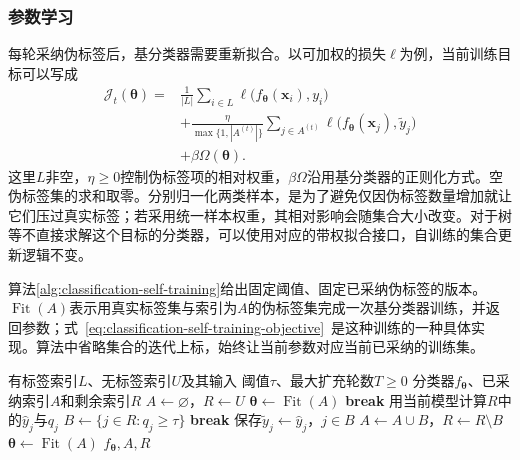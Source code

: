 \subsubsection{参数学习}
\label{sec:classification-self-training-learning}

每轮采纳伪标签后，基分类器需要重新拟合。以可加权的损失$\ell$为例，当前训练目标可以写成
\begin{equation}
  \label{eq:classification-self-training-objective}
  \begin{aligned}
    \mathcal{J}_t(\bm{\theta})
      ={}&\frac{1}{|L|}\sum_{i\in L}
        \ell\bigl(f_{\bm{\theta}}(\bm{x}_i),y_i\bigr)\\
      &+\frac{\eta}{\max\{1,|A^{(t)}|\}}
        \sum_{j\in A^{(t)}}
        \ell\bigl(f_{\bm{\theta}}(\bm{x}_j),\widetilde y_j\bigr)\\
      &+\beta\Omega(\bm{\theta}).
  \end{aligned}
\end{equation}
这里$L$非空，$\eta\geq0$控制伪标签项的相对权重，$\beta\Omega$沿用基分类器的正则化方式。空伪标签集的求和取零。分别归一化两类样本，是为了避免仅因伪标签数量增加就让它们压过真实标签；若采用统一样本权重，其相对影响会随集合大小改变。对于树等不直接求解这个目标的分类器，可以使用对应的带权拟合接口，自训练的集合更新逻辑不变。

算法\ref{alg:classification-self-training}给出固定阈值、固定已采纳伪标签的版本。$\operatorname{Fit}(A)$表示用真实标签集与索引为$A$的伪标签集完成一次基分类器训练，并返回参数；式~\eqref{eq:classification-self-training-objective}~是这种训练的一种具体实现。算法中省略集合的迭代上标，始终让当前参数对应当前已采纳的训练集。

\begin{algorithm}[带最终重训的自训练]
  \label{alg:classification-self-training}
  \begin{algorithmic}[1]
    \Require 有标签索引$L$、无标签索引$U$及其输入
    \Require 阈值$\tau$、最大扩充轮数$T\geq0$
    \Ensure 分类器$f_{\bm{\theta}}$、已采纳索引$A$和剩余索引$R$
    \State $A\gets\varnothing$，$R\gets U$
    \State $\bm{\theta}\gets\operatorname{Fit}(A)$
        \State \textbf{break}
      \EndIf
      \State 用当前模型计算$R$中的$\widehat y_j$与$q_j$
      \State $B\gets\{j\in R:q_j\geq\tau\}$
        \State \textbf{break}
      \EndIf
      \State 保存$\widetilde y_j\gets\widehat y_j$，$j\in B$
      \State $A\gets A\cup B$，$R\gets R\setminus B$
      \State $\bm{\theta}\gets\operatorname{Fit}(A)$
    \EndFor
    \State \Return $f_{\bm{\theta}},A,R$
  \end{algorithmic}
\end{algorithm}

